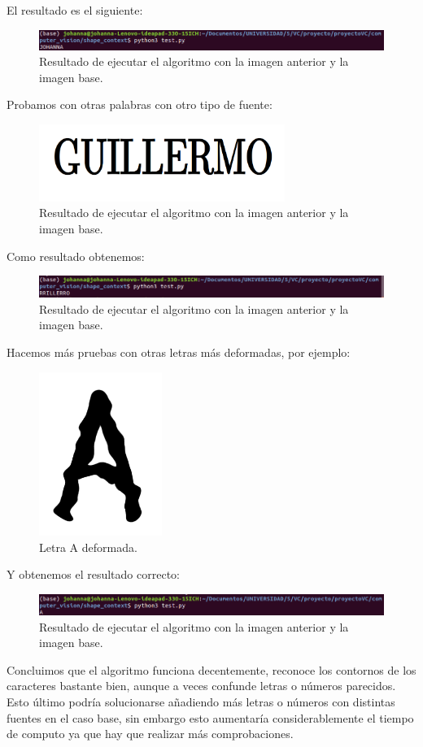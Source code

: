 \documentclass[size=a4, parskip=half, titlepage=false, toc=flat, toc=bib, 12pt]{scrartcl}
\begin{document}
El resultado es el siguiente:
\begin{figure}[H]
\centering
\includegraphics[width=15cm]{./img/resjohanna}
\caption{Resultado de ejecutar el algoritmo con la imagen anterior y la imagen base.}
\end{figure}

Probamos con otras palabras con otro tipo de fuente:
\begin{figure}[H]
\centering
\includegraphics[width=8cm]{./img/GUILLERMO}
\caption{Resultado de ejecutar el algoritmo con la imagen anterior y la imagen base.}
\end{figure}

Como resultado obtenemos:

\begin{figure}[H]
\centering
\includegraphics[width=15cm]{./img/resguillermo}
\caption{Resultado de ejecutar el algoritmo con la imagen anterior y la imagen base.}
\end{figure}

Hacemos más pruebas con otras letras más deformadas, por ejemplo:

\begin{figure}[H]
\centering
\includegraphics[width=4cm]{./img/AM}
\caption{Letra A deformada.}
\end{figure}

Y obtenemos el resultado correcto:
\begin{figure}[H]
\centering
\includegraphics[width=15cm]{./img/resa}
\caption{Resultado de ejecutar el algoritmo con la imagen anterior y la imagen base.}
\end{figure}

Concluimos que el algoritmo funciona decentemente, reconoce los contornos de los caracteres bastante bien, aunque a veces confunde letras o números parecidos. Esto último podría solucionarse añadiendo más letras o números con distintas fuentes en el caso base, sin embargo esto aumentaría considerablemente el tiempo de computo ya que hay que realizar más comprobaciones.
\end{document}
